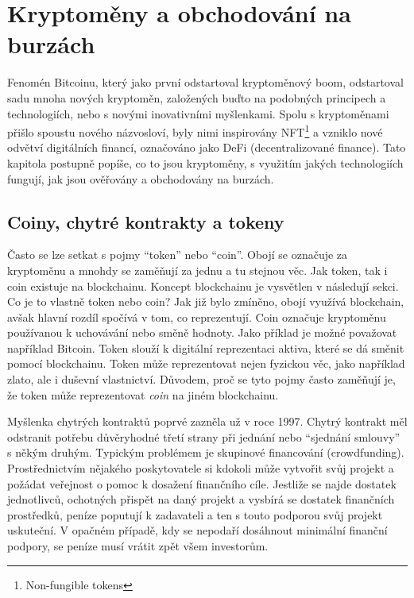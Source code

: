 \chapter{Kryptoměny a obchodování na burzách}
\label{sec:CryptoAndTrading}

Fenomén Bitcoinu, který jako první odstartoval kryptoměnový boom, odstartoval sadu mnoha nových
kryptoměn, založených buďto na podobných principech a technologiích, nebo s novými inovativními myšlenkami.
Spolu s kryptoměnami přišlo spoustu nového názvosloví, byly nimi inspirovány NFT\footnote{Non-fungible tokens} a vzniklo
nové odvětví digitálních financí, označováno jako DeFi (decentralizované finance).
Tato kapitola postupně popíše, co to jsou kryptoměny, s využitím jakých technologiích fungují, jak jsou ověřovány
a obchodovány na burzách.


\section{Coiny, chytré kontrakty a tokeny}
\label{sec:CoinsTokensSmartContracts}
Často se lze setkat s pojmy \enquote{token} nebo \enquote{coin}. Obojí se označuje za kryptoměnu a mnohdy se zaměňují
za jednu a tu stejnou věc. Jak token, tak i coin existuje na blockchainu.
Koncept blockchainu je vysvětlen v následují sekci. Co je to vlastně token nebo coin? Jak již bylo zmíněno, obojí využívá
blockchain, avšak hlavní rozdíl spočívá v tom, co reprezentují. Coin označuje kryptoměnu používanou k uchovávání
nebo směně hodnoty. Jako příklad je možné považovat například Bitcoin. Token slouží k digitální reprezentaci
aktiva, které se dá směnit pomocí blockchainu. Token může reprezentovat nejen fyzickou věc, jako například zlato, ale i
duševní vlastnictví. Důvodem, proč se tyto pojmy často zaměňují je, že token může reprezentovat \emph{coin} na jiném blockchainu.

Myšlenka chytrých kontraktů poprvé zazněla už v roce 1997. Chytrý kontrakt měl odstranit potřebu důvěryhodné třetí strany při
jednání nebo \enquote{sjednání smlouvy} s někým druhým. Typickým problémem je skupinové financování (crowdfunding). Prostřednictvím
nějakého poskytovatele si kdokoli může vytvořit svůj projekt a požádat veřejnost o pomoc k dosažení finančního cíle. Jestliže se najde dostatek
jednotlivců, ochotných přispět na daný projekt a vysbírá se dostatek finančních prostředků, peníze poputují k zadavateli a ten s touto podporou
svůj projekt uskuteční. V opačném případě, kdy se nepodaří dosáhnout minimální finanční podpory, se peníze musí vrátit zpět všem investorům.

